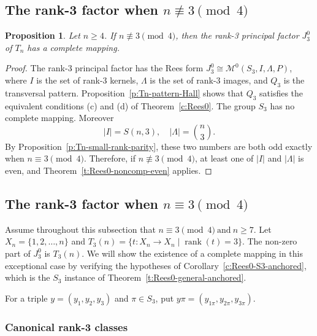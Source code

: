 \documentclass[11pt]{article}
\theoremstyle{plain}
\newtheorem{prop}[theorem]{Proposition}
\theoremstyle{remark}
\theoremstyle{definition}
\theoremstyle{plain}
\DeclareMathOperator{\rank}{rank}
\begin{document}
\subsection[The rank-3 factor when n is not congruent to 3 modulo 4]{The rank-3 factor when $n\not\equiv 3\pmod 4$}
\label{Sec:Tn-rank-three-nonexceptional}

\begin{prop}\label{p:Tn-rank3-nonexceptional}
Let $n\ge4$. If $n\not\equiv3\pmod4$, then the rank-3 principal factor
$J_3^0$ of $T_n$ has a complete mapping.
\end{prop}

\begin{proof}
The rank-3 principal factor has the Rees form
 $J_3^0\cong\mathcal M^0(S_3,I,\Lambda,P)$,
where $I$ is the set of rank-3 kernels, $\Lambda$ is the set of rank-3
images, and $Q_3$ is the transversal pattern. Proposition~\ref{p:Tn-pattern-Hall}
shows that $Q_3$ satisfies the equivalent conditions (c) and (d) of
Theorem~\ref{c:Rees0}. The group $S_3$ has no complete mapping. Moreover
\[
|I|=S(n,3),
        \quad
        |\Lambda|=\binom n3.
\]
By Proposition~\ref{p:Tn-small-rank-parity}, these two numbers are both odd
exactly when $n\equiv3\pmod4$. Therefore, if $n\not\equiv3\pmod4$, at least
one of $|I|$ and $|\Lambda|$ is even, and Theorem~\ref{t:Rees0-noncomp-even}
applies.
\end{proof}

\subsection[The rank-3 factor]{The rank-3 factor when $n\equiv 3\pmod 4$}
\label{t3:Sec:T3-transformations}

Assume throughout this subsection that
$n\equiv 3\pmod 4
       \ \text{and}\
        n\ge7$.
Let $X_n=\{1,2,\ldots,n\}$ and $T_3(n)=\{t\colon X_n\to X_n\mid\rank(t)=3\}$.
The non-zero part of $J_3^0$ is $T_3(n)$. We will show the existence of a complete mapping in this exceptional case by
verifying the hypotheses of Corollary~\ref{c:Rees0-S3-anchored}, which is the
$S_3$ instance of Theorem~\ref{t:Rees0-general-anchored}.

For a triple $y=(y_1,y_2,y_3)$ and $\pi\in S_3$, put
$y\pi=(y_{1\pi},y_{2\pi},y_{3\pi})$.

\subsubsection{Canonical rank-3 classes}
\end{document}

